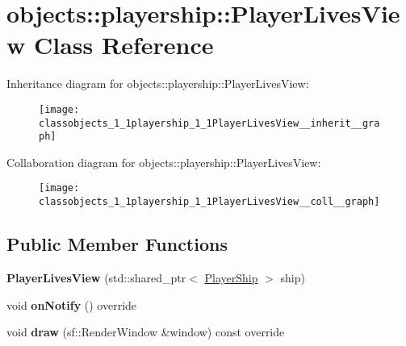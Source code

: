 \hypertarget{classobjects_1_1playership_1_1PlayerLivesView}{}\section{objects\+:\+:playership\+:\+:Player\+Lives\+View Class Reference}
\label{classobjects_1_1playership_1_1PlayerLivesView}


Inheritance diagram for objects\+:\+:playership\+:\+:Player\+Lives\+View\+:\nopagebreak
\begin{figure}[H]
\begin{center}
\leavevmode
\texttt{[image: classobjects\_1\_1playership\_1\_1PlayerLivesView\_\_inherit\_\_graph]}
\end{center}
\end{figure}


Collaboration diagram for objects\+:\+:playership\+:\+:Player\+Lives\+View\+:\nopagebreak
\begin{figure}[H]
\begin{center}
\leavevmode
\texttt{[image: classobjects\_1\_1playership\_1\_1PlayerLivesView\_\_coll\_\_graph]}
\end{center}
\end{figure}
\subsection*{Public Member Functions}
\begin{DoxyCompactItemize}
\item 
\mbox{\label{classobjects_1_1playership_1_1PlayerLivesView_a3641cc3d57cd2d39c239ccf55bbf753b}}
{\bfseries Player\+Lives\+View} (std\+::shared\+\_\+ptr$<$ \hyperlink{classobjects_1_1playership_1_1PlayerShip}{Player\+Ship} $>$ ship)
\item 
\mbox{\label{classobjects_1_1playership_1_1PlayerLivesView_acb60896fe7d67a869173161c3df8221c}}
void {\bfseries on\+Notify} () override
\item 
\mbox{\label{classobjects_1_1playership_1_1PlayerLivesView_afda45f04f11cb8e76b9de1595b0feceb}}
void {\bfseries draw} (sf\+::\+Render\+Window \&window) const override
\end{DoxyCompactItemize}
